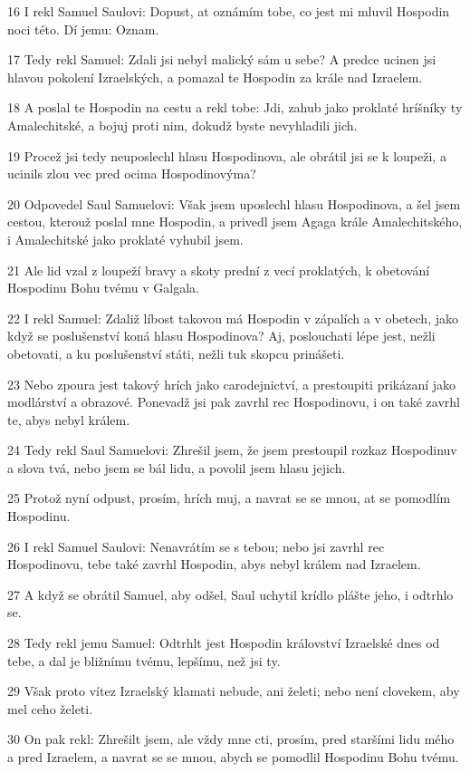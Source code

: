 \par 16 I rekl Samuel Saulovi: Dopust, at oznámím tobe, co jest mi mluvil Hospodin noci této. Dí jemu: Oznam.
\par 17 Tedy rekl Samuel: Zdali jsi nebyl malický sám u sebe? A predce ucinen jsi hlavou pokolení Izraelských, a pomazal te Hospodin za krále nad Izraelem.
\par 18 A poslal te Hospodin na cestu a rekl tobe: Jdi, zahub jako proklaté hríšníky ty Amalechitské, a bojuj proti nim, dokudž byste nevyhladili jich.
\par 19 Procež jsi tedy neuposlechl hlasu Hospodinova, ale obrátil jsi se k loupeži, a ucinils zlou vec pred ocima Hospodinovýma?
\par 20 Odpovedel Saul Samuelovi: Však jsem uposlechl hlasu Hospodinova, a šel jsem cestou, kterouž poslal mne Hospodin, a privedl jsem Agaga krále Amalechitského, i Amalechitské jako proklaté vyhubil jsem.
\par 21 Ale lid vzal z loupeží bravy a skoty prední z vecí proklatých, k obetování Hospodinu Bohu tvému v Galgala.
\par 22 I rekl Samuel: Zdaliž líbost takovou má Hospodin v zápalích a v obetech, jako když se poslušenství koná hlasu Hospodinova? Aj, poslouchati lépe jest, nežli obetovati, a ku poslušenství státi, nežli tuk skopcu prinášeti.
\par 23 Nebo zpoura jest takový hrích jako carodejnictví, a prestoupiti prikázaní jako modlárství a obrazové. Ponevadž jsi pak zavrhl rec Hospodinovu, i on také zavrhl te, abys nebyl králem.
\par 24 Tedy rekl Saul Samuelovi: Zhrešil jsem, že jsem prestoupil rozkaz Hospodinuv a slova tvá, nebo jsem se bál lidu, a povolil jsem hlasu jejich.
\par 25 Protož nyní odpust, prosím, hrích muj, a navrat se se mnou, at se pomodlím Hospodinu.
\par 26 I rekl Samuel Saulovi: Nenavrátím se s tebou; nebo jsi zavrhl rec Hospodinovu, tebe také zavrhl Hospodin, abys nebyl králem nad Izraelem.
\par 27 A když se obrátil Samuel, aby odšel, Saul uchytil krídlo plášte jeho, i odtrhlo se.
\par 28 Tedy rekl jemu Samuel: Odtrhlt jest Hospodin království Izraelské dnes od tebe, a dal je bližnímu tvému, lepšímu, než jsi ty.
\par 29 Však proto vítez Izraelský klamati nebude, ani želeti; nebo není clovekem, aby mel ceho želeti.
\par 30 On pak rekl: Zhrešilt jsem, ale vždy mne cti, prosím, pred staršími lidu mého a pred Izraelem, a navrat se se mnou, abych se pomodlil Hospodinu Bohu tvému.

